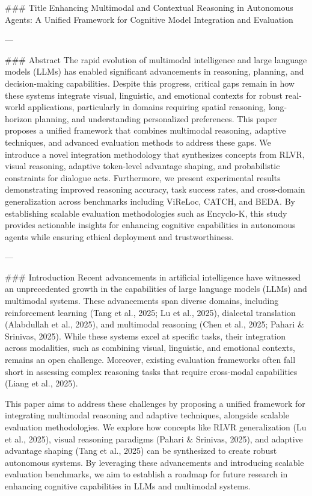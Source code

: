 ### Title
Enhancing Multimodal and Contextual Reasoning in Autonomous Agents: A Unified Framework for Cognitive Model Integration and Evaluation

---

### Abstract
The rapid evolution of multimodal intelligence and large language models (LLMs) has enabled significant advancements in reasoning, planning, and decision-making capabilities. Despite this progress, critical gaps remain in how these systems integrate visual, linguistic, and emotional contexts for robust real-world applications, particularly in domains requiring spatial reasoning, long-horizon planning, and understanding personalized preferences. This paper proposes a unified framework that combines multimodal reasoning, adaptive techniques, and advanced evaluation methods to address these gaps. We introduce a novel integration methodology that synthesizes concepts from RLVR, visual reasoning, adaptive token-level advantage shaping, and probabilistic constraints for dialogue acts. Furthermore, we present experimental results demonstrating improved reasoning accuracy, task success rates, and cross-domain generalization across benchmarks including ViReLoc, CATCH, and BEDA. By establishing scalable evaluation methodologies such as Encyclo-K, this study provides actionable insights for enhancing cognitive capabilities in autonomous agents while ensuring ethical deployment and trustworthiness.

---

### Introduction
Recent advancements in artificial intelligence have witnessed an unprecedented growth in the capabilities of large language models (LLMs) and multimodal systems. These advancements span diverse domains, including reinforcement learning (Tang et al., 2025; Lu et al., 2025), dialectal translation (Alabdullah et al., 2025), and multimodal reasoning (Chen et al., 2025; Pahari & Srinivas, 2025). While these systems excel at specific tasks, their integration across modalities, such as combining visual, linguistic, and emotional contexts, remains an open challenge. Moreover, existing evaluation frameworks often fall short in assessing complex reasoning tasks that require cross-modal capabilities (Liang et al., 2025).

This paper aims to address these challenges by proposing a unified framework for integrating multimodal reasoning and adaptive techniques, alongside scalable evaluation methodologies. We explore how concepts like RLVR generalization (Lu et al., 2025), visual reasoning paradigms (Pahari & Srinivas, 2025), and adaptive advantage shaping (Tang et al., 2025) can be synthesized to create robust autonomous systems. By leveraging these advancements and introducing scalable evaluation benchmarks, we aim to establish a roadmap for future research in enhancing cognitive capabilities in LLMs and multimodal systems.

